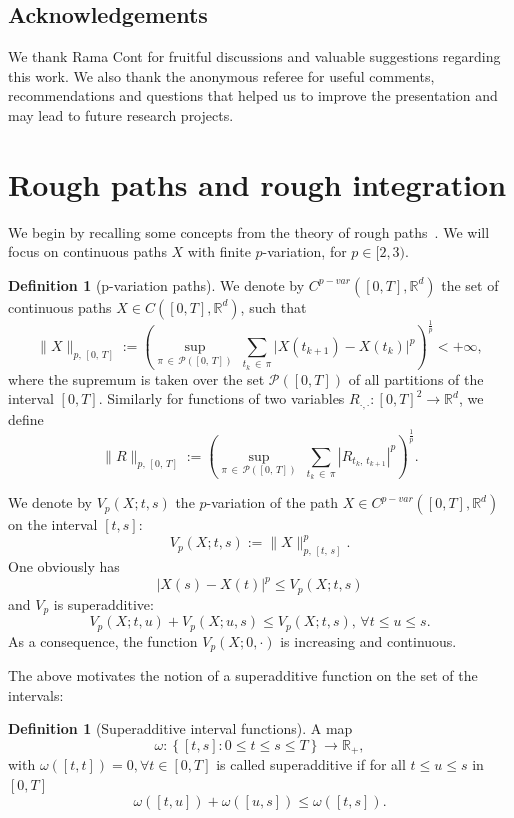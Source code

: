 \documentclass[10pt]{amsart}
\theoremstyle{definition}\newtheorem{defi}[theo]{Definition}\newtheorem{rema}[theo]{Remark}\newtheorem{exam}[theo]{Example}\newtheorem{exem}[theo]{Example}\newtheorem{nota}[theo]{Notation}
\newcommand{\calP}{\mathcal{P}}
\newcommand{\Rr}{{\mathbb{R}}}
\let\oldforall\forall
\renewcommand*{\forall}{\mathrel{\oldforall}}
\begin{document}
\subsection*{Acknowledgements}
We thank Rama Cont for fruitful discussions and valuable suggestions regarding this work. We also thank the anonymous referee for useful comments, recommendations and questions that helped us to improve the presentation and may lead to future research projects.


\section{Rough paths and rough integration}\label{chp:introrough}


We begin by recalling some concepts from the theory of rough paths~\cite{frizhairer,lyons2007,lyons98}. We will focus on continuous paths $X$ with finite $p$-variation, for $p\in [2, 3)$.

\begin{defi}[{p-variation paths}]
We denote by $C^{p-var}([0,T],\Rr^d)$ the set of continuous paths $X\in C([0,T], \Rr^d)$, such that
\[
\|X\|_{p,\,[0,\,T]}:=
\left(\sup_{\pi\,\in\,\calP\left([0,\,T]\right)}\;\sum_{t_k\,\in\,\pi} \big|X\left(t_{k+1}\right)-X\left(t_k\right)\big|^p\right)^{\frac 1 p}<+\infty,
\]
where the supremum is taken over the set $\calP([0,T])$ of all partitions of the interval $[0,T].$ Similarly for functions of two variables $R_{\cdot, \cdot}\colon[0,T]^2\to \Rr^d$, we define
\[
\|R\|_{p,\,\left[0,\,T\right]}:=\left(\sup_{\pi\,\in\,\calP\left([0,\,T]\right)}\;\sum_{t_k\,\in\,\pi} \left|R_{t_k,\,t_{k+1}}\right|^p\right)^{\frac 1 p}.
\]
\end{defi}

We denote by $V_p(X;t,s)$ the $p$-variation of the path ${X\in}C^{p-var}([0,T],\Rr^d)$ on the interval $[t,s]$:
\[
V_p(X;t,s):=\|X\|^p_{p,\,[t,\,s]}.
\]
One obviously has
\begin{equation}\label{chp2ieq:varholder}
\left|X(s)-X(t)\right|^p\leq V_p(X; t, s)
\end{equation}
and $V_p$ is superadditive:
\begin{equation}\label{chp2ieq:varadditive}
V_p(X; t,u)+V_p(X; u,s)\leq V_p(X;t,s),\, \forall t\leq u\leq s.
\end{equation}
As a consequence, the function $V_p(X; 0, \cdot)$ is increasing and continuous.

The above motivates the notion of a superadditive function on the set of the intervals:
\begin{defi}[Superadditive interval functions]
A map
\[
\omega\colon\left\{ [t,s]\colon 0\leq t\leq s\leq T \right\}\to \Rr_+,
\]
with $\omega([t,t])=0, \forall t\in[0,T]$ is called superadditive if for all $t\leq u\leq s$ in $[0, T]$
\[
\omega([t,u])+\omega([u,s])\leq \omega([t,s]).
\]
\end{defi}
\end{document}

